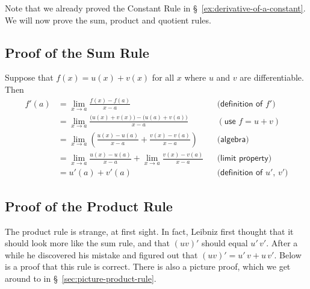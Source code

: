 Note that we already proved the Constant Rule in
\S~\ref{ex:derivative-of-a-constant}.  We will now prove the sum,
product and quotient rules.

\subsection{Proof of the Sum Rule}
Suppose that $f(x)=u(x)+v(x)$ for
all $x$ where $u$ and $v$ are differentiable. Then
\begin{align*}
  f'(a)
  & =\lim_{x\to a}\frac{f(x)-f(a)}{x-a}
  &&\textsf{(definition of $f'$)} \\
  & =\lim_{x\to a}\frac{\bigl(u(x)+v(x)\bigr)-\bigl(u(a)+v(a)\bigr)}{x-a}
  &&(\textsf{use }f=u+v)\\
  & =\lim_{x\to a}\left(\frac{u(x)-u(a)}{x-a}+\frac{v(x)-v(a)}{x-a}\right)
  &&\textsf{(algebra)} \\
  & =\lim_{x\to a}\frac{u(x)-u(a)}{x-a}+\lim_{x\to a}\frac{v(x)-v(a)}{x-a}
  &&\textsf{(limit property)} \\[3pt]
  &=u'(a)+v'(a)
  &&\textsf{(definition of $u'$, $v'$)} 
\end{align*}




\subsection{Proof of the Product Rule}
The product rule is strange, at
first sight.  In fact, Leibniz first thought that it should look more
like the sum rule, and that $(uv)'$ should equal $u'\,v'$.  After
a while he discovered his mistake and figured out that $(uv)' =
u'\,v+u\, v'$.  Below is a proof that this rule is correct.  There is
also a picture proof, which we get around to in
\S~\ref{sec:picture-product-rule}.

